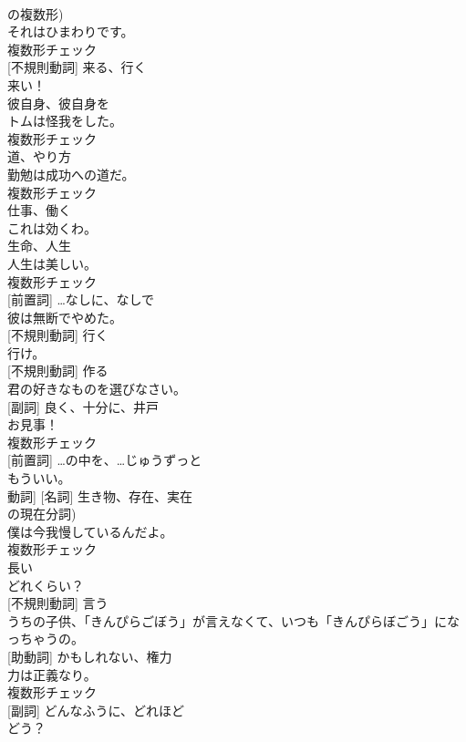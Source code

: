 \documentclass[8pt]{extreport}
\begin{document}
\begin{CJK}{UTF8}{min}
\\	の複数形)	
\\	それはひまわりです。	
\\	複数形チェック
\\	[動詞] [不規則動詞]	来る、行く	
\\	来い！	
\\	[代名詞]	彼自身、彼自身を	
\\	トムは怪我をした。	
\\	複数形チェック
\\	[名詞]	道、やり方	
\\	勤勉は成功への道だ。	
\\	複数形チェック
\\	[動詞]	仕事、働く	
\\	これは効くわ。	
\\	[名詞]	生命、人生	
\\	人生は美しい。	
\\	複数形チェック
\\	[副詞] [前置詞]	…なしに、なしで	
\\	彼は無断でやめた。	
\\	[動詞] [不規則動詞]	行く	
\\	行け。	
\\	[動詞] [不規則動詞]	作る	
\\	君の好きなものを選びなさい。	
\\	[名詞] [副詞]	良く、十分に、井戸	
\\	お見事！	
\\	複数形チェック
\\	[副詞] [前置詞]	…の中を、…じゅうずっと	
\\	もういい。	
\\	動詞] [名詞]	生き物、存在、実在 
\\	の現在分詞)	
\\	僕は今我慢しているんだよ。	
\\	複数形チェック
\\	[形容詞]	長い	
\\	どれくらい？	
\\	[動詞] [不規則動詞]	言う	
\\	うちの子供、「きんぴらごぼう」が言えなくて、いつも「きんぴらぼごう」になっちゃうの。	
\\	[名詞] [助動詞]	かもしれない、権力	
\\	力は正義なり。	
\\	複数形チェック
\\	[名詞] [副詞]	どんなふうに、どれほど	
\\	どう？	

\end{CJK}
\end{document}
